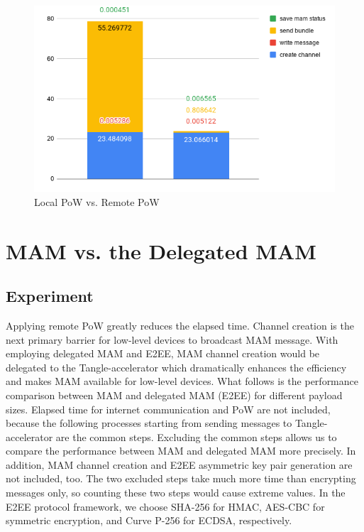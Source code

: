\begin{spacing}{2.0}
\begin{figure}[H]
    \centering
    \includegraphics[width=5in]{img/rpi3_pow}
    \caption{Local PoW vs. Remote PoW}
    \label{fig:rpi3_pow}
\end{figure}

\section{MAM vs. the Delegated MAM}
\label{section:smart_contract_evaluation}

\subsection{Experiment}
Applying remote PoW greatly reduces the elapsed time. Channel creation is the next primary barrier for low-level devices to broadcast MAM message. With employing delegated MAM and E2EE, MAM channel creation would be delegated to the Tangle-accelerator which dramatically enhances the efficiency and makes MAM available for low-level devices. What follows is the performance comparison between MAM and delegated MAM (E2EE) for different payload sizes. Elapsed time for internet communication and PoW are not included, because the following processes starting from sending messages to Tangle-accelerator are the common steps. Excluding the common steps allows us to compare the performance between MAM and delegated MAM more precisely. In addition, MAM channel creation and E2EE asymmetric key pair generation are not included, too. The two excluded steps take much more time than encrypting messages only, so counting these two steps would cause extreme values. In the E2EE protocol framework, we choose SHA-256 for HMAC, AES-CBC for symmetric encryption, and Curve P-256 for ECDSA, respectively.


\end{spacing}
